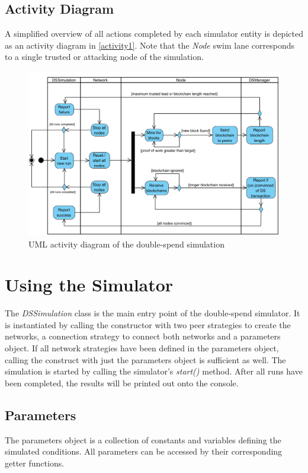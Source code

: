 \documentclass[a4paper,12pt,twoside]{report}
\begin{document}
\subsection{Activity Diagram}
A simplified overview of all actions completed by each simulator entity is depicted as an activity diagram in \autoref{activity1}. Note that the \textit{Node} swim lane corresponds to a single trusted or attacking node of the simulation.
\begin{figure}[ht]
	\centering
  \includegraphics[width=\textwidth]{Activity1.png}
	\caption{UML activity diagram of the double-spend simulation}
	\label{activity1}
\end{figure}

\section{Using the Simulator}
The \textit{DSSimulation} class is the main entry point of the double-spend simulator. It is instantiated by calling the constructor with two peer strategies to create the networks, a connection strategy to connect both networks and a parameters object. If all network strategies have been defined in the parameters object, calling the construct with just the parameters object is sufficient as well. The simulation is started by calling the simulator's \textit{start()} method. After all runs have been completed, the results will be printed out onto the console. 
\subsection{Parameters} \label{params}
The parameters object is a collection of constants and variables defining the simulated conditions. All parameters can be accessed by their corresponding getter functions.
\end{document}
